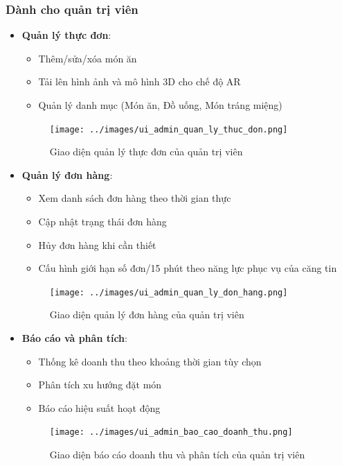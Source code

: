 \documentclass[12pt,a4paper]{article}
\begin{document}
\subsubsection{Dành cho quản trị viên}
\begin{itemize}[leftmargin=1cm]
    \item \textbf{Quản lý thực đơn}:
        \begin{itemize}[leftmargin=0.5cm]
            \item Thêm/sửa/xóa món ăn
            \item Tải lên hình ảnh và mô hình 3D cho chế độ AR
            \item Quản lý danh mục (Món ăn, Đồ uống, Món tráng miệng)
        \end{itemize}
\begin{figure}[H]
    \centering
    \texttt{[image: ../images/ui\_admin\_quan\_ly\_thuc\_don.png]} %
    \caption{Giao diện quản lý thực đơn của quản trị viên}
    \label{fig:ui_admin_menu}
\end{figure}

    \item \textbf{Quản lý đơn hàng}:
        \begin{itemize}[leftmargin=0.5cm]
            \item Xem danh sách đơn hàng theo thời gian thực
            \item Cập nhật trạng thái đơn hàng
            \item Hủy đơn hàng khi cần thiết
            \item Cấu hình giới hạn số đơn/15 phút theo năng lực phục vụ của căng tin
        \end{itemize}
\begin{figure}[H]
    \centering
    \texttt{[image: ../images/ui\_admin\_quan\_ly\_don\_hang.png]} %
    \caption{Giao diện quản lý đơn hàng của quản trị viên}
    \label{fig:ui_admin_orders}
\end{figure}

    \item \textbf{Báo cáo và phân tích}:
        \begin{itemize}[leftmargin=0.5cm]
            \item Thống kê doanh thu theo khoảng thời gian tùy chọn
            \item Phân tích xu hướng đặt món
            \item Báo cáo hiệu suất hoạt động
        \end{itemize}
\begin{figure}[H]
    \centering
    \texttt{[image: ../images/ui\_admin\_bao\_cao\_doanh\_thu.png]} %
    \caption{Giao diện báo cáo doanh thu và phân tích của quản trị viên}
    \label{fig:ui_admin_revenue}
\end{figure}


\end{itemize}
\end{document}
